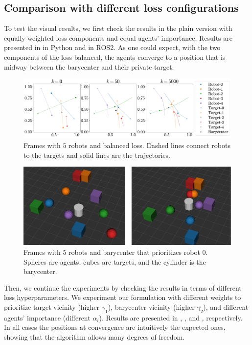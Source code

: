 \documentclass[a4paper,11pt,oneside]{book}
\begin{document}
\subsection{Comparison with different loss configurations}

To test the visual results, we first check the results in the plain version with equally weighted loss components and equal agents' importance. Results are presented in  in Python and  in ROS2. As one could expect, with the two components of the loss balanced, the agents converge to a position that is midway between the barycenter and their private target.
\begin{figure}[H]
      \centering
      \includegraphics[width=0.9\linewidth]{./figs/aggregative/plain_anim/anim.pdf} 
      \caption{Frames with $5$ robots and balanced loss. Dashed lines connect robots to the targets and solid lines are the trajectories.}
      \label{fig:anim_plain}
\end{figure}

\begin{figure}[H]
      \centering
      \includegraphics[width=0.75\linewidth]{./figs/aggregative/plain_anim/ros2.png} 
      \caption{Frames with $5$ robots and barycenter that prioritizes robot $0$. Spheres are agents, cubes are targets, and the cylinder is the barycenter.}
      \label{fig:anim_plain_ros2}
\end{figure}

Then, we continue the experiments by checking the results in terms of different loss hyperparameters. We experiment our formulation with different weights to prioritize target vicinity (higher $\gamma_1$), barycenter vicinity (higher $\gamma_2$), and different agents' importance (different $\alpha_i$). Results are presented in , , and , respectively. In all cases the positions at convergence are intuitively the expected ones, showing that the algorithm allows many degrees of freedom.
\end{document}
